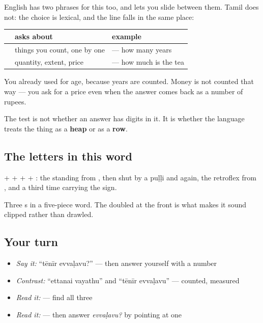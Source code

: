 \begin{grammarlens}[title={Grammar Lens: measure or count}]
English has two phrases for this too, and lets you slide between them. Tamil does not: the choice is lexical, and the line falls in the same place:

\noindent
\begin{tabularx}{\linewidth}{@{}>{\raggedright\arraybackslash}X>{\raggedright\arraybackslash}X>{\raggedright\arraybackslash}X@{}}
\toprule
\textbf{} & \textbf{asks about} & \textbf{example} \\
\midrule
\textbf{\ta{எத்தனை}} & things you count, one by one & \textbf{\ta{எத்தனை} \ta{வயது}} — how many years \\
\textbf{\ta{எவ்வளவு}} & quantity, extent, price & \textbf{\ta{தேநீர்} \ta{எவ்வளவு}} — how much is the tea \\
\bottomrule
\end{tabularx}

You already used \textbf{} for age, because years are counted. Money is not counted that way — you ask \textbf{} for a price even when the answer comes back as a number of rupees.

The test is not whether an answer has digits in it. It is whether the language treats the thing as a \textbf{heap} or as a \textbf{row}.
\end{grammarlens}

\subsection*{The letters in this word}
\textbf{} + \textbf{} + \textbf{} + \textbf{} + \textbf{}: the standing \textbf{} from \textbf{}, then \textbf{} shut by a puḷḷi and \textbf{} again, the retroflex \textbf{} from \textbf{}, and \textbf{} a third time carrying the \textbf{} sign.

Three \textbf{}s in a five-piece word. The doubled \textbf{} at the front is what makes it sound clipped rather than drawled.

\subsection*{Your turn}
\begin{itemize}
\raggedright
  \item \emph{Say it:} \textquotedblleft{}tēnīr evvaḷavu?\textquotedblright{} — then answer yourself with a number
  \item \emph{Contrast:} \textquotedblleft{}ettanai vayathu\textquotedblright{} and \textquotedblleft{}tēnīr evvaḷavu\textquotedblright{} — counted, measured
  \item \emph{Read it:} \textbf{} — find all three \textbf{}
  \item \emph{Read it:} \textbf{    } — then answer \emph{evvaḷavu?} by pointing at one
\end{itemize}

